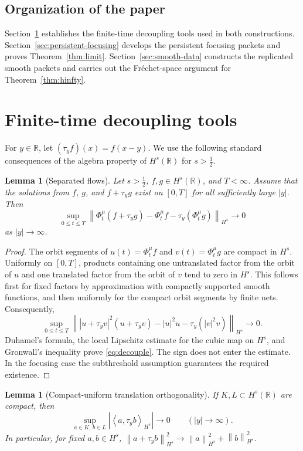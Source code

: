 \documentclass[10pt,a4paper]{amsart}
\numberwithin{equation}{section}
\newtheorem{lemma}[theorem]{Lemma}
\newcommand{\R}{\mathbb R}
\newcommand{\half}{\frac12}
\newcommand{\norm}[1]{\left\lVert #1\right\rVert}
\newcommand{\abs}[1]{\left\lvert #1\right\rvert}
\newcommand{\ip}[2]{\left\langle #1,#2\right\rangle}
\newcommand{\flow}[1]{\Phi^{#1}}
\newcommand{\trans}[1]{\tau_{#1}}
\begin{document}
\subsection{Organization of the paper}
Section~\ref{sec:decoupling} establishes the finite-time decoupling tools used
in both constructions.  Section~\ref{sec:persistent-focusing} develops the
persistent focusing packets and proves Theorem~\ref{thm:limit}.
Section~\ref{sec:smooth-data} constructs the replicated smooth packets and
carries out the Fr\'echet-space argument for Theorem~\ref{thm:hinfty}.


\section{Finite-time decoupling tools}\label{sec:decoupling}

For $y\in\R$, let $(\trans yf)(x)=f(x-y)$.  We use the following standard
consequences of the algebra property of $H^s(\R)$ for $s>\half$.

\begin{lemma}[Separated flows]\label{lem:decouple}
Let $s>\half$, $f,g\in H^s(\R)$, and $T<\infty$.  Assume that the solutions
from $f$, $g$, and $f+\trans yg$ exist on $[0,T]$ for all sufficiently large
$|y|$.  Then
\begin{equation}\label{eq:decouple}
 \sup_{0\leq t\leq T}
 \norm{\flow\mu_t(f+\trans yg)-\flow\mu_tf-
 \trans y(\flow\mu_tg)}_{H^s}\longrightarrow0
\end{equation}
as $|y|\to\infty$.
\end{lemma}

\begin{proof}
The orbit segments of $u(t)=\flow\mu_tf$ and $v(t)=\flow\mu_tg$ are compact
in $H^s$.  Uniformly on $[0,T]$, products containing one untranslated factor
from the orbit of $u$ and one translated factor from the orbit of $v$ tend to
zero in $H^s$.  This follows first for fixed factors by approximation with
compactly supported smooth functions, and then uniformly for the compact
orbit segments by finite nets.  Consequently,
\[
 \sup_{0\leq t\leq T}
 \norm{|u+\trans yv|^2(u+\trans yv)-|u|^2u-
 \trans y(|v|^2v)}_{H^s}\longrightarrow0.
\]
Duhamel's formula, the local Lipschitz estimate for the cubic map on $H^s$,
and Gronwall's inequality prove \eqref{eq:decouple}.  The sign does not enter
the estimate.  In the focusing case the subthreshold assumption guarantees
the required existence.
\end{proof}

\begin{lemma}[Compact-uniform translation orthogonality]\label{lem:orthog}
If $K,L\subset H^s(\R)$ are compact, then
\begin{equation}\label{eq:orthog}
 \sup_{a\in K,\,b\in L}
 \abs{\ip a{\trans yb}_{H^s}}\longrightarrow0
 \qquad (|y|\to\infty).
\end{equation}
In particular, for fixed $a,b\in H^s$,
$\norm{a+\trans yb}_{H^s}^2\to\norm a_{H^s}^2+\norm b_{H^s}^2$.
\end{lemma}
\end{document}
